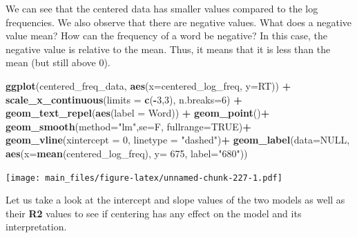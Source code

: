 \documentclass[
]{book}
\newenvironment{Shaded}{\begin{snugshade}}{\end{snugshade}}
\newcommand{\AttributeTok}[1]{\textcolor[rgb]{0.13,0.29,0.53}{#1}}
\newcommand{\ConstantTok}[1]{\textcolor[rgb]{0.56,0.35,0.01}{#1}}
\newcommand{\DecValTok}[1]{\textcolor[rgb]{0.00,0.00,0.81}{#1}}
\newcommand{\FunctionTok}[1]{\textcolor[rgb]{0.13,0.29,0.53}{\textbf{#1}}}
\newcommand{\NormalTok}[1]{#1}
\newcommand{\SpecialCharTok}[1]{\textcolor[rgb]{0.81,0.36,0.00}{\textbf{#1}}}
\newcommand{\StringTok}[1]{\textcolor[rgb]{0.31,0.60,0.02}{#1}}
\begin{document}
We can see that the centered data has smaller values compared to the log frequencies. We also observe that there are negative values. What does a negative value mean? How can the frequency of a word be negative? In this case, the negative value is relative to the mean. Thus, it means that it is less than the mean (but still above 0).

\begin{Shaded}
\begin{Highlighting}[]
\FunctionTok{ggplot}\NormalTok{(centered\_freq\_data, }\FunctionTok{aes}\NormalTok{(}\AttributeTok{x=}\NormalTok{centered\_log\_freq, }\AttributeTok{y=}\NormalTok{RT)) }\SpecialCharTok{+}
  \FunctionTok{scale\_x\_continuous}\NormalTok{(}\AttributeTok{limits =} \FunctionTok{c}\NormalTok{(}\SpecialCharTok{{-}}\DecValTok{3}\NormalTok{,}\DecValTok{3}\NormalTok{), }\AttributeTok{n.breaks=}\DecValTok{6}\NormalTok{) }\SpecialCharTok{+}
  \FunctionTok{geom\_text\_repel}\NormalTok{(}\FunctionTok{aes}\NormalTok{(}\AttributeTok{label =}\NormalTok{ Word)) }\SpecialCharTok{+}
  \FunctionTok{geom\_point}\NormalTok{()}\SpecialCharTok{+}
  \FunctionTok{geom\_smooth}\NormalTok{(}\AttributeTok{method=}\StringTok{"lm"}\NormalTok{,}\AttributeTok{se=}\NormalTok{F, }\AttributeTok{fullrange=}\ConstantTok{TRUE}\NormalTok{)}\SpecialCharTok{+}
  \FunctionTok{geom\_vline}\NormalTok{(}\AttributeTok{xintercept =} \DecValTok{0}\NormalTok{, }\AttributeTok{linetype =} \StringTok{"dashed"}\NormalTok{)}\SpecialCharTok{+}
  \FunctionTok{geom\_label}\NormalTok{(}\AttributeTok{data=}\ConstantTok{NULL}\NormalTok{, }\FunctionTok{aes}\NormalTok{(}\AttributeTok{x=}\FunctionTok{mean}\NormalTok{(centered\_log\_freq), }\AttributeTok{y=} \DecValTok{675}\NormalTok{, }\AttributeTok{label=}\StringTok{"680"}\NormalTok{))}
\end{Highlighting}
\end{Shaded}

\texttt{[image: main\_files/figure-latex/unnamed-chunk-227-1.pdf]}

Let us take a look at the intercept and slope values of the two models as well as their \textbf{R2} values to see if centering has any effect on the model and its interpretation.

\begin{Shaded}
\end{Shaded}
\end{document}
